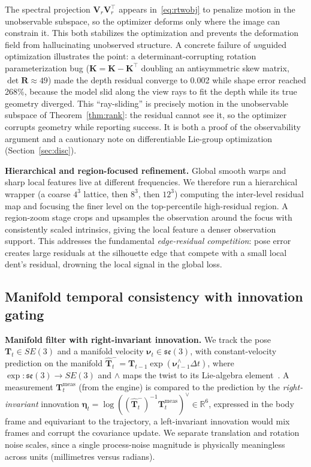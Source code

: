 \documentclass[9pt,twoside,web]{ieeecolor2}
\begin{document}
The spectral projection $\mathbf{V}_{r}\mathbf{V}_{r}^{\top}$ appears in~\eqref{eq:rtwobj} to penalize motion in the unobservable subspace, so the optimizer deforms only where the image can constrain it. This both stabilizes the optimization and prevents the deformation field from hallucinating unobserved structure. A concrete failure of \emph{un}guided optimization illustrates the point: a determinant-corrupting rotation parameterization bug ($\mathbf{K}=\mathbf{K}-\mathbf{K}^{\top}$ doubling an antisymmetric skew matrix, $\det\mathbf{R}\approx49$) made the depth residual converge to 0.002 while shape error reached 268\%, because the model slid along the view rays to fit the depth while its true geometry diverged. This ``ray-sliding'' is precisely motion in the unobservable subspace of Theorem~\ref{thm:rank}: the residual cannot see it, so the optimizer corrupts geometry while reporting success. It is both a proof of the observability argument and a cautionary note on differentiable Lie-group optimization (Section~\ref{sec:disc}).

\textbf{Hierarchical and region-focused refinement.} Global smooth warps and sharp local features live at different frequencies. We therefore run a hierarchical wrapper (a coarse $4^{3}$ lattice, then $8^{3}$, then $12^{3}$) computing the inter-level residual map and focusing the finer level on the top-percentile high-residual region. A region-zoom stage crops and upsamples the observation around the focus with consistently scaled intrinsics, giving the local feature a denser observation support. This addresses the fundamental \emph{edge-residual competition}: pose error creates large residuals at the silhouette edge that compete with a small local dent's residual, drowning the local signal in the global loss.

\subsection{Manifold temporal consistency with innovation gating}\label{sec:kalman}

\textbf{Manifold filter with right-invariant innovation.} We track the pose $\mathbf{T}_{t}\in SE(3)$ and a manifold velocity $\boldsymbol{\nu}_{t}\in\mathfrak{se}(3)$, with constant-velocity prediction on the manifold $\hat{\mathbf{T}}_{t}^{-}=\mathbf{T}_{t-1}\exp(\boldsymbol{\nu}_{t-1}^{\wedge}\Delta t)$, where $\exp:\mathfrak{se}(3)\to SE(3)$ and $\wedge$ maps the twist to its Lie-algebra element~\cite{sola2018lie}. A measurement $\mathbf{T}_{t}^{\mathrm{meas}}$ (from the engine) is compared to the prediction by the \emph{right-invariant} innovation $\boldsymbol{\eta}_{t}=\log((\hat{\mathbf{T}}_{t}^{-})^{-1}\mathbf{T}_{t}^{\mathrm{meas}})^{\vee}\in\mathbb{R}^{6}$, expressed in the body frame and equivariant to the trajectory, a left-invariant innovation would mix frames and corrupt the covariance update. We separate translation and rotation noise scales, since a single process-noise magnitude is physically meaningless across units (millimetres versus radians).
\end{document}
